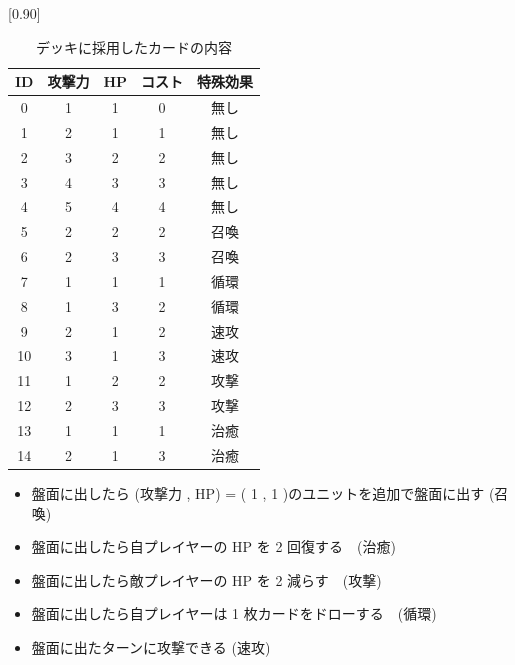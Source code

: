 \documentclass[twocolumn]{jarticle}
\begin{document}
\begin{table}[t]
  \centering
  \small
  \caption{デッキに採用したカードの内容}
  \label{table:deck}
  \vspace{-0.3cm}
  \scalebox{0.90}[0.90]{
    \begin{tabular}{|c|c|c|c|c|}
      \hline
      ID & 攻撃力 & HP & コスト & 特殊効果 \\ \hline
      0 & 1 & 1 & 0 & 無し \\ \hline
      1 & 2 & 1 & 1 & 無し \\ \hline
      2 & 3 & 2 & 2 & 無し \\ \hline
      3 & 4 & 3 & 3 & 無し \\ \hline
      4 & 5 & 4 & 4 & 無し \\ \hline
      5 & 2 & 2 & 2 & 召喚 \\ \hline
      6 & 2 & 3 & 3 & 召喚 \\ \hline
      7 & 1 & 1 & 1 & 循環 \\ \hline
      8 & 1 & 3 & 2 & 循環 \\ \hline
      9 & 2 & 1 & 2 & 速攻 \\ \hline
      10 & 3 & 1 & 3 & 速攻 \\ \hline
      11 & 1 & 2 & 2 & 攻撃 \\ \hline
      12 & 2 & 3 & 3 & 攻撃 \\ \hline
      13 & 1 & 1 & 1 & 治癒 \\ \hline
      14 & 2 & 1 & 3 & 治癒 \\ \hline
      \end{tabular}
  }
  
\end{table}

  \begin{itemize}
  
  
  \setlength{\itemsep}{0cm} %
   \item 盤面に出したら (攻撃力 , HP) = ( 1 , 1 )のユニットを追加で盤面に出す (召喚)
   \item 盤面に出したら自プレイヤーの HP を 2 回復する　(治癒)
   \item 盤面に出したら敵プレイヤーの HP を 2 減らす　(攻撃)
   \item 盤面に出したら自プレイヤーは 1 枚カードをドローする　(循環)
   \item 盤面に出たターンに攻撃できる (速攻)
  \end{itemize}
\end{document}
